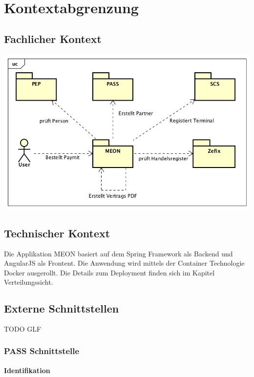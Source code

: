 \graphicspath{{./images/}}

\chapter{Kontextabgrenzung}

\section{Fachlicher Kontext}

\begin{center}
	\includegraphics[scale=0.7]{kontext.png}
\end{center}


\section{Technischer Kontext}

Die Applikation MEON basiert auf dem Spring Framework als Backend und AngularJS als Frontent. Die Anwendung wird mittels der Container Technologie Docker ausgerollt. Die Details zum Deployment finden sich im Kapitel Verteilungssicht.

\section{Externe Schnittstellen}

TODO GLF

\subsection{PASS Schnittstelle}
		
\subsubsection{Identifikation}

